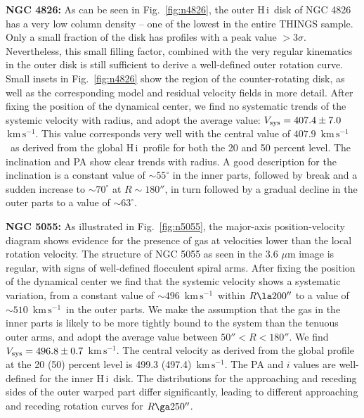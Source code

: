 \documentclass[usenatbib,usegraphicx,apjfonts,floatfix]{emulateapj}
\newcommand{\kms}{\ensuremath{\,\mbox{km}\,\mbox{s}^{-1}}}
\newcommand{\HI}{H\,{\sc i}}
\begin{document}
{\bf NGC 4826:} As can be seen in Fig.~\ref{fig:n4826}, the outer \HI\
disk of NGC 4826 has a very low column density -- one of the lowest in
the entire THINGS sample. Only a small fraction of the disk has
profiles with a peak value $>3\sigma$. Nevertheless, this small
filling factor, combined with the very regular kinematics in the outer
disk is still sufficient to derive a well-defined outer rotation
curve.  Small insets in Fig.~\ref{fig:n4826} show the region of the
counter-rotating disk, as well as the corresponding model and residual
velocity fields in more detail.
After fixing the position of the dynamical center, we find no
systematic trends of the systemic velocity with radius, and adopt the
average value: $V_{\rm sys} = 407.4 \pm 7.0$ \kms. This value
corresponds very well with the central value of $407.9$ \kms\ as
derived from the global \HI\ profile for both the 20 and 50 percent
level.  The inclination and PA show clear trends with radius. A good
description for the inclination is a constant value of $\sim
55^{\circ}$ in the inner parts, followed by break and a sudden
increase to $\sim 70^{\circ}$ at $R\sim 180''$, in turn followed by a
gradual decline in the outer parts to a value of $\sim 63^{\circ}$.

{\bf NGC 5055: } As illustrated in Fig.~\ref{fig:n5055}, the
major-axis position-velocity diagram shows evidence for the presence
of gas at velocities lower than the local rotation velocity. The
structure of NGC 5055 as seen in the 3.6 $\mu$m image is regular, with
signs of well-defined flocculent spiral arms.  After fixing the
position of the dynamical center we find that the systemic velocity
shows a systematic variation, from a constant value of $\sim 496$
\kms\ within $R\la 200''$ to a value of $\sim 510$ \kms\ in the outer
parts. We make the assumption that the gas in the inner parts is
likely to be more tightly bound to the system than the tenuous outer
arms, and adopt the average value between $50'' < R < 180''$. We find
$V_{\rm sys} = 496.8 \pm 0.7$ \kms. The central velocity as derived
from the global profile at the 20 (50) percent level is 499.3 (497.4)
\kms.  The PA and $i$ values are well-defined for the inner \HI\
disk. The distributions for the approaching and receding sides of the
outer warped part differ significantly, leading to different
approaching and receding rotation curves for $R \ga 250''$.
\end{document}
